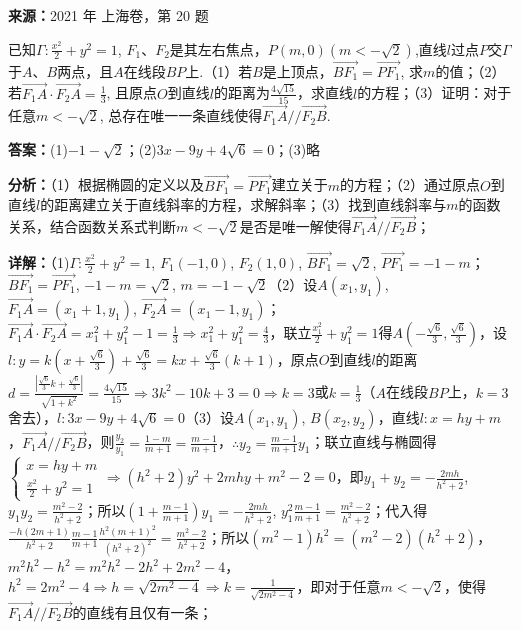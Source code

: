 \begin{question}[points=16]
\textbf{来源：}2021 年 上海卷，第 20 题\par
已知$\Gamma:\frac{x^2}{2}+y^2=1$, $F_1$、$F_2$是其左右焦点，$P(m,0)(m<-\sqrt{2})$,直线$l$过点$P$交$\Gamma$于$A$、$B$两点，且$A$在线段$BP$上.（1）若$B$是上顶点，$\overrightarrow{BF_1}=\overrightarrow{PF_1}$, 求$m$的值；（2）若$\overrightarrow{F_1A}\cdot\overrightarrow{F_2A}=\frac{1}{3}$, 且原点$O$到直线$l$的距离为$\frac{4\sqrt{15}}{15}$，求直线$l$的方程；（3）证明：对于任意$m<-\sqrt{2}$, 总存在唯一一条直线使得$\overrightarrow{F_1A}//\overrightarrow{F_2B}$.
\begin{solution}
\textbf{答案：}(1)$-1-\sqrt{2}$；(2)$3x-9y+4\sqrt{6}=0$；(3)略

\textbf{分析：}（1）根据椭圆的定义以及$\overrightarrow{BF_1}=\overrightarrow{PF_1}$建立关于$m$的方程；（2）通过原点$O$到直线$l$的距离建立关于直线斜率的方程，求解斜率；（3）找到直线斜率与$m$的函数关系，结合函数关系式判断$m<-\sqrt{2}$是否是唯一解使得$\overrightarrow{F_1A}//\overrightarrow{F_2B}$；

\textbf{详解：}（1)$\Gamma:\frac{x^2}{2}+y^2=1$, $F_1(-1,0)$, $F_2(1,0)$, $\overrightarrow{BF_1}=\sqrt{2}$, $\overrightarrow{PF_1}=-1-m$；$\overrightarrow{BF_1}=\overrightarrow{PF_1}$, $-1-m=\sqrt{2}$, $m=-1-\sqrt{2}$（2）设$A(x_1,y_1)$, $\overrightarrow{F_1A}=(x_1+1,y_1)$, $\overrightarrow{F_2A}=(x_1-1,y_1)$；$\overrightarrow{F_1A}\cdot\overrightarrow{F_2A}=x_1^2+y_1^2-1=\frac{1}{3}\Rightarrow x_1^2+y_1^2=\frac{4}{3}$，联立$\frac{x_1^2}{2}+y_1^2=1$得$A(-\frac{\sqrt{6}}{3},\frac{\sqrt{6}}{3})$，设$l:y=k(x+\frac{\sqrt{6}}{3})+\frac{\sqrt{6}}{3}=kx+\frac{\sqrt{6}}{3}(k+1)$，原点$O$到直线$l$的距离$d=\frac{|\frac{\sqrt{6}}{3}k+\frac{\sqrt{6}}{3}|}{\sqrt{1+k^2}}=\frac{4\sqrt{15}}{15}\Rightarrow3k^2-10k+3=0\Rightarrow k=3$或$k=\frac{1}{3}$（$A$在线段$BP$上，$k=3$舍去），$l:3x-9y+4\sqrt{6}=0$（3）设$A(x_1,y_1)$, $B(x_2,y_2)$，直线$l:x=hy+m$，$\overrightarrow{F_1A}//\overrightarrow{F_2B}$，则$\frac{y_2}{y_1}=\frac{1-m}{m+1}=\frac{m-1}{m+1}$，$\therefore y_2=\frac{m-1}{m+1}y_1$；联立直线与椭圆得$\begin{cases}x=hy+m\\\frac{x^2}{2}+y^2=1\end{cases}\Rightarrow(h^2+2)y^2+2mhy+m^2-2=0$，即$y_1+y_2=-\frac{2mh}{h^2+2}$, $y_1y_2=\frac{m^2-2}{h^2+2}$；所以$(1+\frac{m-1}{m+1})y_1=-\frac{2mh}{h^2+2}$, $y_1^2\frac{m-1}{m+1}=\frac{m^2-2}{h^2+2}$；代入得$\frac{-h(2m+1)}{h^2+2}\frac{m-1}{m+1}\frac{h^2(m+1)^2}{(h^2+2)^2}=\frac{m^2-2}{h^2+2}$；所以$(m^2-1)h^2=(m^2-2)(h^2+2)$，$m^2h^2-h^2=m^2h^2-2h^2+2m^2-4$，$h^2=2m^2-4\Rightarrow h=\sqrt{2m^2-4}\Rightarrow k=\frac{1}{\sqrt{2m^2-4}}$，即对于任意$m<-\sqrt{2}$，使得$\overrightarrow{F_1A}//\overrightarrow{F_2B}$的直线有且仅有一条；
\end{solution}
\end{question}

